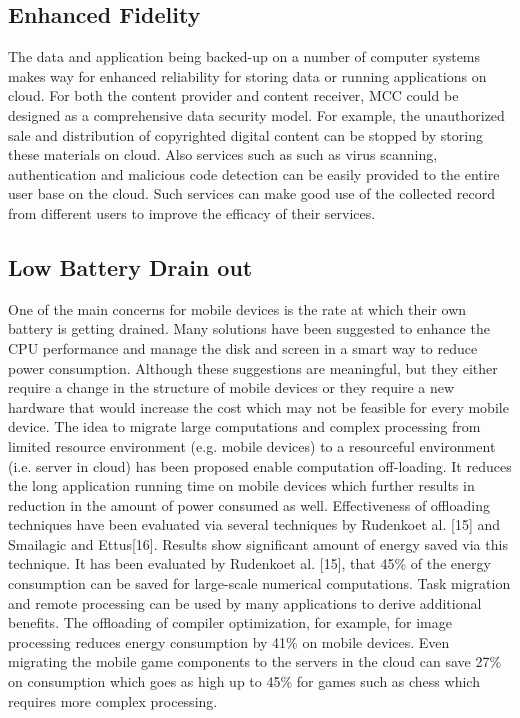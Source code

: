 \documentclass[10pt, conference, compsocconf]{IEEEtran}
\begin{document}
\subsection{Enhanced Fidelity}
The data and application being backed-up on a number of computer systems makes way for enhanced reliability for storing data or running applications on cloud. For both the content provider and content receiver, MCC could be designed as a comprehensive data security model. For example, the unauthorized sale and distribution of copyrighted digital content can be stopped by storing these materials on cloud. Also services such as such as virus scanning, authentication and malicious code detection can be easily provided to the entire user base on the cloud. Such services can make good use of the collected record from different users to improve the efficacy of their services.

\subsection{Low Battery Drain out}
One of the main concerns for mobile devices is the rate at which their own battery is getting drained. Many solutions have been suggested to enhance the CPU performance and manage the disk and screen in a smart way to reduce power consumption. Although these suggestions are meaningful, but they either require a change in the structure of mobile devices or they require a new hardware that would increase the cost which may not be feasible for every mobile device. The idea to migrate large computations and complex processing from limited resource environment (e.g. mobile devices) to a resourceful environment (i.e. server in cloud) has been proposed enable computation off-loading. It reduces the long application running time on mobile devices which further results in reduction in the amount of power consumed as well. Effectiveness of offloading techniques have been evaluated via several techniques by Rudenkoet al. [15] and Smailagic and Ettus[16]. Results show significant amount of energy saved via this technique. It has been evaluated by Rudenkoet al. [15], that 45\% of the energy consumption can be saved for large-scale numerical computations. Task migration and remote processing can be used by many applications to derive additional benefits. The offloading of compiler optimization, for example, for image processing reduces energy consumption by 41\% on mobile devices. Even migrating the mobile game components to the servers in the cloud can save 27\% on consumption which goes as high up to 45\% for games such as chess which requires more complex processing.
\end{document}

